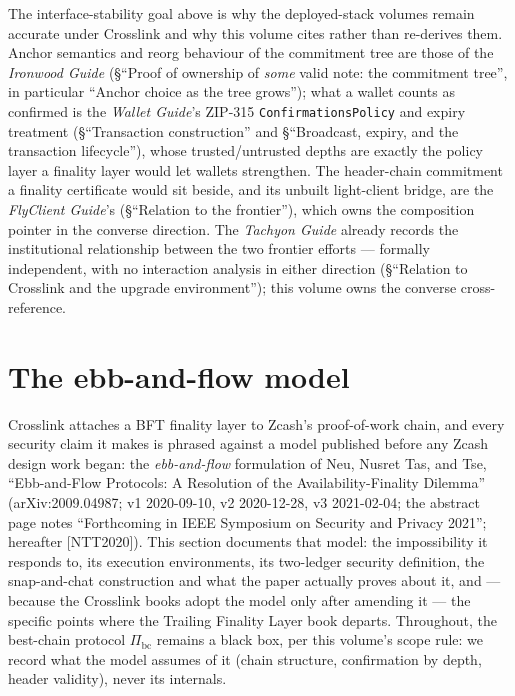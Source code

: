 \documentclass[11pt,a4paper]{article}
\theoremstyle{definition}
\begin{document}
The interface-stability goal above is why the deployed-stack volumes
remain accurate under Crosslink and why this volume cites rather than
re-derives them. Anchor semantics and reorg behaviour of the commitment
tree are those of the \emph{Ironwood Guide} (\S``Proof of ownership of
\emph{some} valid note: the commitment tree'', in particular ``Anchor
choice as the tree grows''); what a wallet counts as confirmed is the
\emph{Wallet Guide}'s ZIP-315 \texttt{ConfirmationsPolicy} and expiry
treatment (\S``Transaction construction'' and \S``Broadcast, expiry, and
the transaction lifecycle''), whose trusted/untrusted depths are exactly
the policy layer a finality layer would let wallets strengthen. The
header-chain commitment a finality certificate would sit beside, and its
unbuilt light-client bridge, are the \emph{FlyClient Guide}'s
(\S``Relation to the frontier''), which owns the composition pointer in
the converse direction. The
\emph{Tachyon Guide} already records the institutional relationship
between the two frontier efforts --- formally independent, with no
interaction analysis in either direction (\S``Relation to Crosslink and
the upgrade environment''); this volume owns the converse
cross-reference.

\section{The ebb-and-flow model}\label{sec:xl-model}

Crosslink attaches a BFT finality layer to Zcash's proof-of-work chain, and
every security claim it makes is phrased against a model published before
any Zcash design work began: the \emph{ebb-and-flow} formulation of Neu,
Nusret Tas, and Tse, ``Ebb-and-Flow Protocols: A Resolution of the
Availability-Finality Dilemma'' (arXiv:2009.04987; v1 2020-09-10, v2
2020-12-28, v3 2021-02-04; the abstract page notes ``Forthcoming in IEEE
Symposium on Security and Privacy 2021''; hereafter [NTT2020]). This section
documents that model: the impossibility it responds to, its execution
environments, its two-ledger security definition, the snap-and-chat
construction and what the paper actually proves about it, and --- because
the Crosslink books adopt the model only after amending it --- the specific
points where the Trailing Finality Layer book departs. Throughout, the
best-chain protocol $\Pi_{\mathrm{bc}}$ remains a black box, per this
volume's scope rule: we record what the model assumes of it (chain
structure, confirmation by depth, header validity), never its internals.
\end{document}
